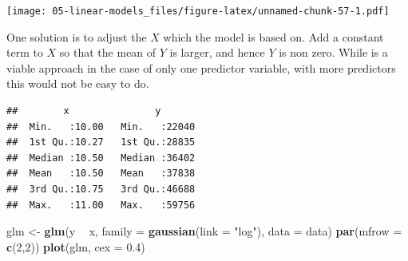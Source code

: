 \documentclass[openany]{book}
\newenvironment{Shaded}{\begin{snugshade}}{\end{snugshade}}
\newcommand{\DataTypeTok}[1]{\textcolor[rgb]{0.13,0.29,0.53}{#1}}
\newcommand{\DecValTok}[1]{\textcolor[rgb]{0.00,0.00,0.81}{#1}}
\newcommand{\FloatTok}[1]{\textcolor[rgb]{0.00,0.00,0.81}{#1}}
\newcommand{\KeywordTok}[1]{\textcolor[rgb]{0.13,0.29,0.53}{\textbf{#1}}}
\newcommand{\NormalTok}[1]{#1}
\newcommand{\OperatorTok}[1]{\textcolor[rgb]{0.81,0.36,0.00}{\textbf{#1}}}
\newcommand{\StringTok}[1]{\textcolor[rgb]{0.31,0.60,0.02}{#1}}
\begin{document}
\begin{Shaded}
\end{Shaded}

\texttt{[image: 05-linear-models\_files/figure-latex/unnamed-chunk-57-1.pdf]}

One solution is to adjust the \(X\) which the model is based on. Add a constant term to \(X\) so that the mean of \(Y\) is larger, and hence \(Y\) is non zero. While is a viable approach in the case of only one predictor variable, with more predictors this would not be easy to do.

\begin{Shaded}
\end{Shaded}

\begin{verbatim}
##        x               y        
##  Min.   :10.00   Min.   :22040  
##  1st Qu.:10.27   1st Qu.:28835  
##  Median :10.50   Median :36402  
##  Mean   :10.50   Mean   :37838  
##  3rd Qu.:10.75   3rd Qu.:46688  
##  Max.   :11.00   Max.   :59756
\end{verbatim}

\begin{Shaded}
\begin{Highlighting}[]
\NormalTok{glm <-}\StringTok{ }\KeywordTok{glm}\NormalTok{(y }\OperatorTok{~}\StringTok{ }\NormalTok{x, }\DataTypeTok{family =} \KeywordTok{gaussian}\NormalTok{(}\DataTypeTok{link =} \StringTok{"log"}\NormalTok{), }\DataTypeTok{data =}\NormalTok{ data)}
\KeywordTok{par}\NormalTok{(}\DataTypeTok{mfrow =} \KeywordTok{c}\NormalTok{(}\DecValTok{2}\NormalTok{,}\DecValTok{2}\NormalTok{))}
\KeywordTok{plot}\NormalTok{(glm, }\DataTypeTok{cex =} \FloatTok{0.4}\NormalTok{)}
\end{Highlighting}
\end{Shaded}
\end{document}
